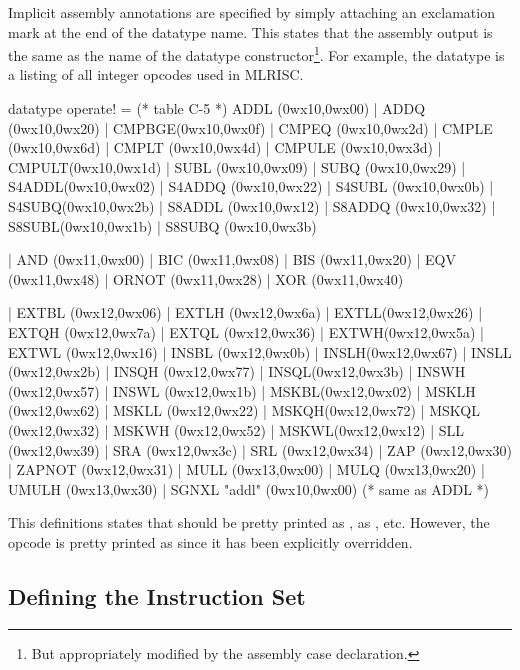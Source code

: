 Implicit assembly annotations are specified by simply attaching 
an exclamation mark at the end of the datatype name.  This states
that the assembly output is the same as the name of the datatype 
constructor\footnote{But appropriately modified by the assembly case 
declaration.}. For example,
the datatype  is a listing of all integer opcodes 
used in MLRISC.  
\begin{SML}
   datatype operate! = (* table C-5 *)
       ADDL  (0wx10,0wx00)                       | ADDQ (0wx10,0wx20)
                           | CMPBGE(0wx10,0wx0f) | CMPEQ (0wx10,0wx2d)
     | CMPLE (0wx10,0wx6d) | CMPLT (0wx10,0wx4d) | CMPULE (0wx10,0wx3d)
     | CMPULT(0wx10,0wx1d) | SUBL  (0wx10,0wx09)
     | SUBQ  (0wx10,0wx29)
     | S4ADDL(0wx10,0wx02) | S4ADDQ (0wx10,0wx22) | S4SUBL (0wx10,0wx0b)
     | S4SUBQ(0wx10,0wx2b) | S8ADDL (0wx10,0wx12) | S8ADDQ (0wx10,0wx32)
     | S8SUBL(0wx10,0wx1b) | S8SUBQ (0wx10,0wx3b)

     | AND   (0wx11,0wx00) | BIC    (0wx11,0wx08) | BIS (0wx11,0wx20)
                                                  | EQV (0wx11,0wx48)
     | ORNOT (0wx11,0wx28) | XOR    (0wx11,0wx40)

     | EXTBL (0wx12,0wx06) | EXTLH  (0wx12,0wx6a) | EXTLL(0wx12,0wx26)
     | EXTQH (0wx12,0wx7a) | EXTQL  (0wx12,0wx36) | EXTWH(0wx12,0wx5a)
     | EXTWL (0wx12,0wx16) | INSBL  (0wx12,0wx0b) | INSLH(0wx12,0wx67)
     | INSLL (0wx12,0wx2b) | INSQH  (0wx12,0wx77) | INSQL(0wx12,0wx3b)
     | INSWH (0wx12,0wx57) | INSWL  (0wx12,0wx1b) | MSKBL(0wx12,0wx02)
     | MSKLH (0wx12,0wx62) | MSKLL  (0wx12,0wx22) | MSKQH(0wx12,0wx72)
     | MSKQL (0wx12,0wx32) | MSKWH  (0wx12,0wx52) | MSKWL(0wx12,0wx12)
     | SLL   (0wx12,0wx39) | SRA    (0wx12,0wx3c) | SRL  (0wx12,0wx34)
     | ZAP   (0wx12,0wx30) | ZAPNOT (0wx12,0wx31)
     | MULL  (0wx13,0wx00)                        | MULQ (0wx13,0wx20)
                           | UMULH  (0wx13,0wx30)
     | SGNXL "addl" (0wx10,0wx00) (* same as ADDL *)
\end{SML}
This definitions states that  should be pretty printed
as ,  as , etc.  However, the opcode 
 is pretty printed as  since it has been explicitly
overridden.

\subsection{Defining the Instruction Set}

